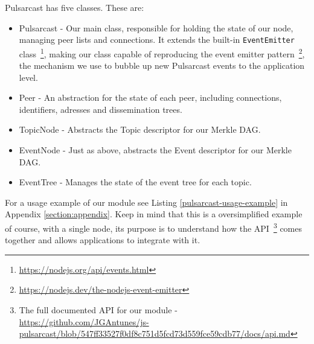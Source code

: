 Pulsarcast has five classes. These are:

\begin{itemize}
  \item
    Pulsarcast - Our main class, responsible for holding the state of our node, managing peer lists and connections. It extends the built-in \verb|EventEmitter| class~\footnote{\url{https://nodejs.org/api/events.html}}, making our class capable of reproducing the event emitter pattern~\footnote{\url{https://nodejs.dev/the-nodejs-event-emitter}}, the mechanism we use to bubble up new Pulsarcast events to the application level.
  \item
		Peer - An abstraction for the state of each peer, including connections, identifiers, adresses and dissemination trees.
  \item
    TopicNode - Abstracts the Topic descriptor for our Merkle DAG.
  \item
    EventNode - Just as above, abstracts the Event descriptor for our Merkle DAG.
  \item
    EventTree - Manages the state of the event tree for each topic.
\end{itemize}

For a usage example of our module see Listing \ref{pulsarcast-usage-example} in
Appendix \ref{section:appendix}. Keep in mind that this is a oversimplified
example of course, with a single node, its purpose is to understand how the
API~\footnote{The full documented API for our module -
\url{https://github.com/JGAntunes/js-pulsarcast/blob/547ff33527f0df8c751d5fcd73d559fce59cdb77/docs/api.md}}
comes together and allows applications to integrate with it.

